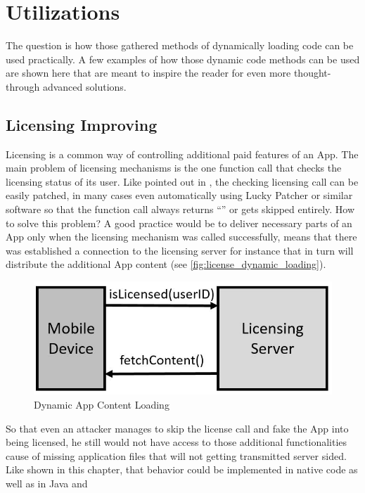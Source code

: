 \section{Utilizations}
The question is how those gathered methods of dynamically loading code can be
used practically. A few examples of how those dynamic code methods can be used
are shown here that are meant to inspire the reader for even more thought-through 
advanced solutions.

\subsection{Licensing Improving}
Licensing is a common way of controlling additional paid
features of an App. The main problem of licensing mechanisms is the one
function call that checks the licensing status of its user. Like pointed
out in \parencite{app_sec}, the checking licensing call can be easily
patched, in many cases even automatically using Lucky Patcher or similar
software so that the function call always returns ``''
or gets skipped entirely. How to solve this problem? A good practice would be to deliver necessary parts of an App only when the licensing mechanism was
called successfully, means that there was established a connection to the
licensing server for instance that in turn will distribute the additional
App content (see \autoref{fig:license_dynamic_loading}).
\begin{figure}[htb]
  \centering
  \includegraphics[scale=0.5]{figures/license_dynamic_loading}
  \caption[Dynamic App Content Loading]{Dynamic App Content Loading}
  \label{fig:license_dynamic_loading}
\end{figure}
So that even an attacker manages to skip the license call and fake the App
into being licensed, he still would not have access to those additional
functionalities cause of missing application files that will not getting
transmitted server sided. Like shown in this chapter,
that behavior could be implemented in native code as well as in Java and
